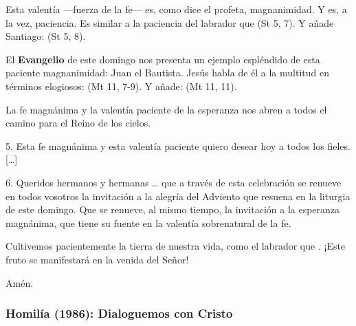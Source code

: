 \begin{body}
						Esta valentía ---fuerza de la fe--- es, como dice el profeta, magnanimidad. Y es, a la vez, paciencia. Es similar a la paciencia del labrador que  (St 5, 7). Y añade Santiago:  (St 5, 8).
						
						El \textbf{Evangelio} de este domingo nos presenta un ejemplo espléndido de esta paciente magnanimidad: Juan el Bautista. Jesús habla de él a la multitud en términos elogiosos:  (Mt 11, 7-9). Y añade:  (Mt 11, 11).
						
						La fe magnánima y la valentía paciente de la esperanza nos abren a todos el camino para el Reino de los cielos.
						
						5. Esta fe magnánima y esta valentía paciente quiero desear hoy a todos los fieles. {[}\ldots{}{]}
						
						6. Queridos hermanos y hermanas \ldots{} que a través de esta celebración se renueve en todos vosotros la invitación a la alegría del Adviento que resuena en la liturgia de este domingo. Que se renueve, al mismo tiempo, la invitación a la esperanza magnánima, que tiene su fuente en la valentía sobrenatural de la fe.
						
						Cultivemos pacientemente la tierra de nuestra vida, como el labrador que . ¡Este fruto se manifestará en la venida del Señor!
						
						Amén.
					\end{body}
						
			\subsubsection{Homilía (1986): Dialoguemos con Cristo}
				
